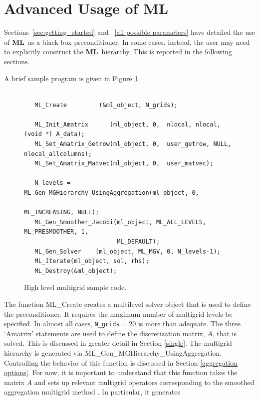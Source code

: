 \documentclass{article}[11pt]
\newcommand{\ML}     {{\bf ML}}
\begin{document}
\clearpage
\newpage

\section{Advanced Usage of \ML} \label{high level sample}
%
Sections~\ref{sec:getting_started} and ~\ref{all possible parameters} have detailed the
use of \ML~as a black box preconditioner. In some cases, instead, the
user may need to explicitly construct the \ML\ hierarchy. This is
reported in the following sections.

\medskip

A brief sample program is given in Figure \ref{high level figure}.
%
\begin{figure}[ht]
\begin{verbatim}

   ML_Create         (&ml_object, N_grids);

   ML_Init_Amatrix      (ml_object, 0,  nlocal, nlocal,(void *) A_data);
   ML_Set_Amatrix_Getrow(ml_object, 0,  user_getrow, NULL, nlocal_allcolumns);
   ML_Set_Amatrix_Matvec(ml_object, 0,  user_matvec);

   N_levels = ML_Gen_MGHierarchy_UsingAggregation(ml_object, 0, 
                                                  ML_INCREASING, NULL);
   ML_Gen_Smoother_Jacobi(ml_object, ML_ALL_LEVELS, ML_PRESMOOTHER, 1, 
                          ML_DEFAULT);
   ML_Gen_Solver    (ml_object, ML_MGV, 0, N_levels-1);
   ML_Iterate(ml_object, sol, rhs);
   ML_Destroy(&ml_object);
\end{verbatim}
\caption{High level multigrid sample code. \label{high level figure}}
\end{figure}
%
The function {\sf ML\_Create} creates a multilevel solver object that is
used to define the preconditioner. It requires the
maximum number of multigrid levels be specified. In
almost all cases, {\tt N\_grids}$ = 20$ is more than
adequate. The three `Amatrix' statements are used to define the 
discretization matrix, $A$, that is solved. This is discussed
in greater detail in Section \ref{single}. The 
multigrid hierarchy is generated via
{\sf ML\_Gen\_MGHierarchy\_UsingAggregation}. Controlling the behavior of
this function is discussed in Section \ref{aggregation options}.
For now, it is important
to understand that this function takes the matrix $A$ and sets up
relevant multigrid operators corresponding to the smoothed aggregation
multigrid method \cite{vanek3} \cite{vanek4}. In particular, it generates
\end{document}
